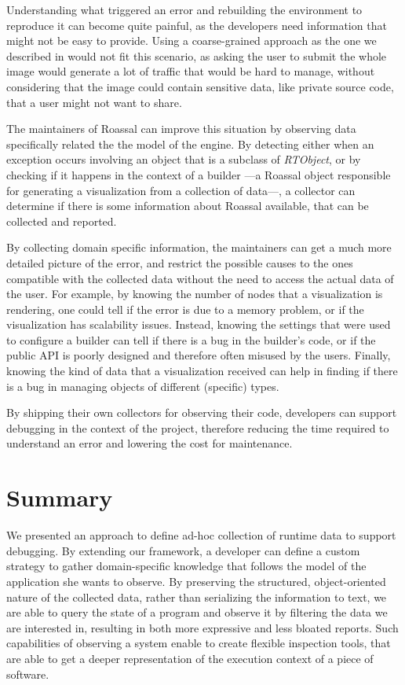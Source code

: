 Understanding what triggered an error and rebuilding the environment to reproduce it can become quite painful, as the developers need information that might not be easy to provide.
Using a coarse-grained approach as the one we described in  would not fit this scenario, as asking the user to submit the whole image would generate a lot of traffic that would be hard to manage, without considering that the image could contain sensitive data, like private source code, that a user might not want to share.

The maintainers of Roassal can improve this situation by observing data specifically related the the model of the engine.
By detecting either when an exception occurs involving an object that is a subclass of \textit{RTObject}, or by checking if it happens in the context of a builder ---a Roassal object responsible for generating a visualization from a collection of data---, a collector can determine if there is some information about Roassal available, that can be collected and reported.

By collecting domain specific information, the maintainers can get a much more detailed picture of the error, and restrict the possible causes to the ones compatible with the collected data without the need to access the actual data of the user.
For example, by knowing the number of nodes that a visualization is rendering, one could tell if the error is due to a memory problem, or if the visualization has scalability issues.
Instead, knowing the settings that were used to configure a builder can tell if there is a bug in the builder's code, or if the public API is poorly designed and therefore often misused by the users.
Finally, knowing the kind of data that a visualization received can help in finding if there is a bug in managing objects of different (specific) types.

By shipping their own collectors for observing their code, developers can support debugging in the context of the project, therefore reducing the time required to understand an error and lowering the cost for maintenance.


\section{Summary}\label{sec:reified-summary}

We presented an approach to define ad-hoc collection of runtime data to support debugging.
By extending our framework, a developer can define a custom strategy to gather domain-specific knowledge that follows the model of the application she wants to observe.
By preserving the structured, object-oriented nature of the collected data, rather than serializing the information to text, we are able to query the state of a program  and observe it by filtering the data we are interested in, resulting in both more expressive and less bloated reports.
Such capabilities of observing a system enable to create flexible inspection tools, that are able to get a deeper representation of the execution context of a piece of software.

